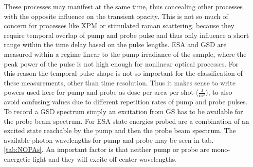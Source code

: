 \documentclass[twoside,openright]{scrreprt}
\begin{document}
These processes may manifest at the same time, thus concealing other processes with the opposite influence on the transient opacity. This is not so much of concern for processes like XPM or stimulated raman scattering, because they require temporal overlap of pump and probe pulse and thus only influence a short range within the time delay based on the pulse lengths. ESA and GSD are measured within a regime linear to the pump irradiance of the sample, where the peak power of the pulse is not high enough for nonlinear optical processes. For this reason the temporal pulse shape is not so important for the classification of these measurements, other than time resolution. Thus it makes sense to write powers used here for pump and probe as dose per area per shot ($\mathrm{\frac{J}{m^2}}$), to also avoid confusing values due to different repetition rates of pump and probe pulses.\\

To record a GSD spectrum simply an excitation from GS has to be available for the probe beam spectrum. For ESA state energies probed are a combination of an excited state reachable by the pump and then the probe beam spectrum. The available photon wavelengths for pump and probe may be seen in tab. \ref{tab:NOPAs}. An important factor is that neither pump or probe are mono-energetic light and they will excite off center wavelengths.
\end{document}
